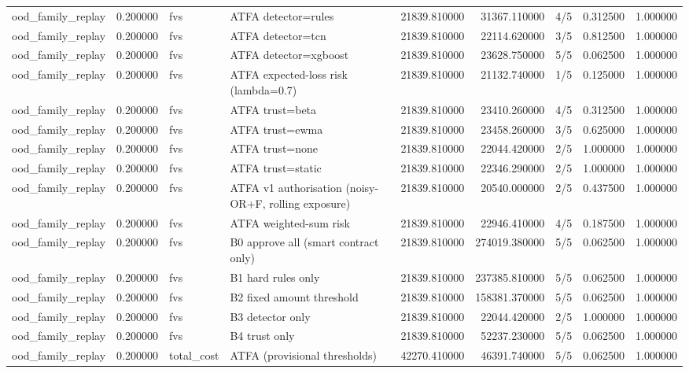 \begin{tabular}{lrllrrlrr}
ood\_family\_replay & 0.200000 & fvs & ATFA detector=rules & 21839.810000 & 31367.110000 & 4/5 & 0.312500 & 1.000000 \\
ood\_family\_replay & 0.200000 & fvs & ATFA detector=tcn & 21839.810000 & 22114.620000 & 3/5 & 0.812500 & 1.000000 \\
ood\_family\_replay & 0.200000 & fvs & ATFA detector=xgboost & 21839.810000 & 23628.750000 & 5/5 & 0.062500 & 1.000000 \\
ood\_family\_replay & 0.200000 & fvs & ATFA expected-loss risk (lambda=0.7) & 21839.810000 & 21132.740000 & 1/5 & 0.125000 & 1.000000 \\
ood\_family\_replay & 0.200000 & fvs & ATFA trust=beta & 21839.810000 & 23410.260000 & 4/5 & 0.312500 & 1.000000 \\
ood\_family\_replay & 0.200000 & fvs & ATFA trust=ewma & 21839.810000 & 23458.260000 & 3/5 & 0.625000 & 1.000000 \\
ood\_family\_replay & 0.200000 & fvs & ATFA trust=none & 21839.810000 & 22044.420000 & 2/5 & 1.000000 & 1.000000 \\
ood\_family\_replay & 0.200000 & fvs & ATFA trust=static & 21839.810000 & 22346.290000 & 2/5 & 1.000000 & 1.000000 \\
ood\_family\_replay & 0.200000 & fvs & ATFA v1 authorisation (noisy-OR+F, rolling exposure) & 21839.810000 & 20540.000000 & 2/5 & 0.437500 & 1.000000 \\
ood\_family\_replay & 0.200000 & fvs & ATFA weighted-sum risk & 21839.810000 & 22946.410000 & 4/5 & 0.187500 & 1.000000 \\
ood\_family\_replay & 0.200000 & fvs & B0 approve all (smart contract only) & 21839.810000 & 274019.380000 & 5/5 & 0.062500 & 1.000000 \\
ood\_family\_replay & 0.200000 & fvs & B1 hard rules only & 21839.810000 & 237385.810000 & 5/5 & 0.062500 & 1.000000 \\
ood\_family\_replay & 0.200000 & fvs & B2 fixed amount threshold & 21839.810000 & 158381.370000 & 5/5 & 0.062500 & 1.000000 \\
ood\_family\_replay & 0.200000 & fvs & B3 detector only & 21839.810000 & 22044.420000 & 2/5 & 1.000000 & 1.000000 \\
ood\_family\_replay & 0.200000 & fvs & B4 trust only & 21839.810000 & 52237.230000 & 5/5 & 0.062500 & 1.000000 \\
ood\_family\_replay & 0.200000 & total\_cost & ATFA (provisional thresholds) & 42270.410000 & 46391.740000 & 5/5 & 0.062500 & 1.000000 \\

\end{tabular}
